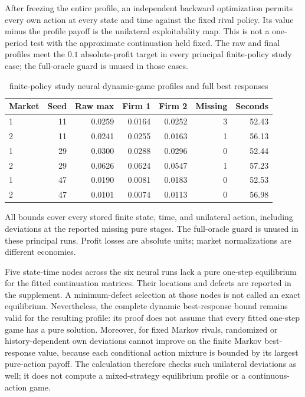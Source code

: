 \documentclass[ecta,nameyear,draft]{econsocart}
\theoremstyle{definition}
\theoremstyle{remark}
\begin{document}
After freezing the entire profile, an independent backward optimization permits every own action at every state and time against the fixed rival policy. Its value minus the profile payoff is the unilateral exploitability map. This is not a one-period test with the approximate continuation held fixed. The raw and final profiles meet the $0.1$ absolute-profit target in every principal finite-policy study case; the full-oracle guard is unused in those cases.

\begin{table}[htbp]\centering
\caption{finite-policy study neural dynamic-game profiles and full best responses}
\begin{small}\begin{tabular}{lrrrrrr}
\toprule
Market & Seed & Raw max & Firm 1 & Firm 2 & Missing & Seconds \\
\midrule
1 & 11 & 0.0259 & 0.0164 & 0.0252 & 3 & 52.43 \\
2 & 11 & 0.0241 & 0.0255 & 0.0163 & 1 & 56.13 \\
1 & 29 & 0.0300 & 0.0288 & 0.0296 & 0 & 52.44 \\
2 & 29 & 0.0626 & 0.0624 & 0.0547 & 1 & 57.23 \\
1 & 47 & 0.0190 & 0.0081 & 0.0183 & 0 & 52.53 \\
2 & 47 & 0.0101 & 0.0074 & 0.0113 & 0 & 56.98 \\
\bottomrule\end{tabular}\end{small}
\par\smallskip\begin{minipage}{0.96\linewidth}\footnotesize All bounds cover every stored finite state, time, and unilateral action, including deviations at the reported missing pure stages. The full-oracle guard is unused in these principal runs. Profit losses are absolute units; market normalizations are different economies.\end{minipage}
\end{table}


Five state-time nodes across the six neural runs lack a pure one-step equilibrium for the fitted continuation matrices. Their locations and defects are reported in the supplement. A minimum-defect selection at those nodes is not called an exact equilibrium. Nevertheless, the complete dynamic best-response bound remains valid for the resulting profile: its proof does not assume that every fitted one-step game has a pure solution. Moreover, for fixed Markov rivals, randomized or history-dependent own deviations cannot improve on the finite Markov best-response value, because each conditional action mixture is bounded by its largest pure-action payoff. The calculation therefore checks such unilateral deviations as well; it does not compute a mixed-strategy equilibrium profile or a continuous-action game.
\end{document}
